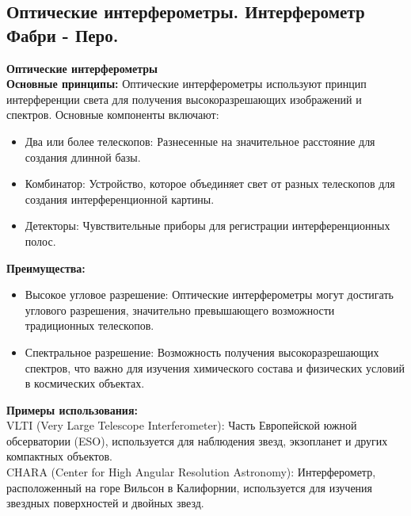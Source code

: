 \documentclass[12pt]{article}
\begin{document}
	\subsection{Оптические интерферометры. Интерферометр Фабри - Перо.}
	
	\textbf{Оптические интерферометры}\\
	\textbf{Основные принципы:}
	Оптические интерферометры используют принцип интерференции света для получения высокоразрешающих изображений и спектров. Основные компоненты включают:
	\begin{itemize}
	\item Два или более телескопов: Разнесенные на значительное расстояние для создания длинной базы.
	\item Комбинатор: Устройство, которое объединяет свет от разных телескопов для создания интерференционной картины.
	\item Детекторы: Чувствительные приборы для регистрации интерференционных полос.
	\end{itemize}
	\textbf{Преимущества:}
	\begin{itemize}
\item	Высокое угловое разрешение: Оптические интерферометры могут достигать углового разрешения, значительно превышающего возможности традиционных телескопов.
\item	Спектральное разрешение: Возможность получения высокоразрешающих спектров, что важно для изучения химического состава и физических условий в космических объектах.
	\end{itemize}
	\textbf{Примеры использования:}\\
	VLTI (Very Large Telescope Interferometer): Часть Европейской южной обсерватории (ESO), используется для наблюдения звезд, экзопланет и других компактных объектов.\\
	CHARA (Center for High Angular Resolution Astronomy): Интерферометр, расположенный на горе Вильсон в Калифорнии, используется для изучения звездных поверхностей и двойных звезд.\\
	
\end{document}
